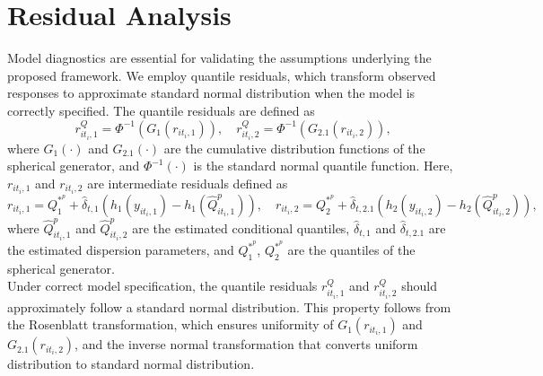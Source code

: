 \documentclass[twoside]{article}
\begin{document}
\section{Residual Analysis}\label{sec4}

Model diagnostics are essential for validating the assumptions underlying the proposed framework. We employ quantile residuals, which transform observed responses to approximate standard normal distribution when the model is correctly specified. The quantile residuals are defined as
\begin{equation}
	r_{it_i,1}^{Q} = \Phi^{-1}\left(G_1(r_{it_i,1})\right), \quad
	r_{it_i,2}^{Q} = \Phi^{-1}\left(G_{2.1}(r_{it_i,2})\right),
\end{equation}
where \( G_1(\cdot) \) and \( G_{2.1}(\cdot) \) are the cumulative distribution functions of the spherical generator, and \( \Phi^{-1}(\cdot) \) is the standard normal quantile function. Here, \( r_{it_i,1} \) and \( r_{it_i,2} \) are intermediate residuals defined as
\begin{equation}
	r_{it_i,1} = Q_1^{\ast^{p}} + \widehat{\delta}_{t,1}\left(h_1(y_{it_i,1}) - h_1(\widehat{Q}_{it_i,1}^{p})\right), \quad
	r_{it_i,2} = Q_2^{\ast^{p}} + \widehat{\delta}_{t,2.1}\left(h_2(y_{it_i,2}) - h_2(\widehat{Q}_{it_i,2}^{p})\right),
\end{equation}
where \( \widehat{Q}_{it_i,1}^{p} \) and \( \widehat{Q}_{it_i,2}^{p} \) are the estimated conditional quantiles, \( \widehat{\delta}_{t,1} \) and \( \widehat{\delta}_{t,2.1} \) are the estimated dispersion parameters, and \( Q_1^{\ast^{p}} \), \( Q_2^{\ast^{p}} \) are the quantiles of the spherical generator.\\
Under correct model specification, the quantile residuals \( r_{it_i,1}^{Q} \) and \( r_{it_i,2}^{Q} \) should approximately follow a standard normal distribution. This property follows from the Rosenblatt transformation, which ensures uniformity of \( G_1(r_{it_i,1}) \) and \( G_{2.1}(r_{it_i,2}) \), and the inverse normal transformation that converts uniform distribution to standard normal distribution.
\end{document}
